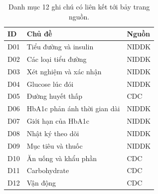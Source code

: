 \begin{table}[H]\centering\small
\caption{Danh mục 12 ghi chú có liên kết tới bảy trang nguồn.}
\begin{tabular}{@{}lll@{}}\toprule
ID & Chủ đề & Nguồn \\\midrule
D01 & Tiểu đường và insulin & NIDDK \\
D02 & Các loại tiểu đường & NIDDK \\
D03 & Xét nghiệm và xác nhận & NIDDK \\
D04 & Glucose lúc đói & NIDDK \\
D05 & Đường huyết thấp & CDC \\
D06 & HbA1c phản ánh thời gian dài & NIDDK \\
D07 & Giới hạn của HbA1c & NIDDK \\
D08 & Nhật ký theo dõi & NIDDK \\
D09 & Mục tiêu và thuốc & NIDDK \\
D10 & Ăn uống và khẩu phần & CDC \\
D11 & Carbohydrate & CDC \\
D12 & Vận động & CDC \\
\bottomrule\end{tabular}
\end{table}